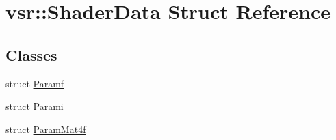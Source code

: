 \hypertarget{structvsr_1_1_shader_data}{\section{vsr\-:\-:Shader\-Data Struct Reference}
\label{structvsr_1_1_shader_data}
}
\subsection*{Classes}
\begin{DoxyCompactItemize}
\item 
struct \hyperlink{structvsr_1_1_shader_data_1_1_paramf}{Paramf}
\item 
struct \hyperlink{structvsr_1_1_shader_data_1_1_parami}{Parami}
\item 
struct \hyperlink{structvsr_1_1_shader_data_1_1_param_mat4f}{Param\-Mat4f}
\end{DoxyCompactItemize}
